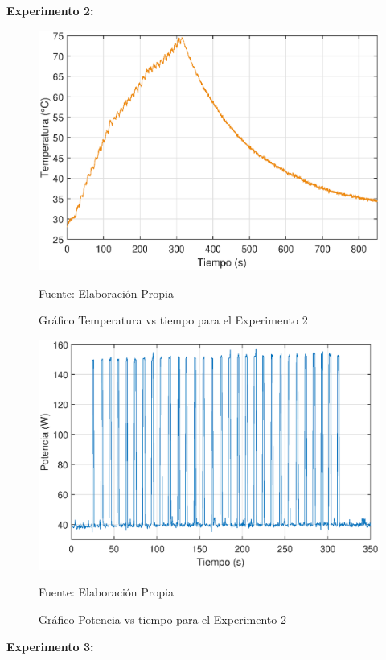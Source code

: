 \textbf{Experimento 2:}

\begin{figure}[H]
\centering
\includegraphics[scale=0.64]{Figuras/Exp1_T.eps}
\caption{Gráfico Temperatura vs tiempo para el Experimento 2}
Fuente: Elaboración Propia
\label{exp2_T}
\end{figure}

\begin{figure}[H]
\centering
\includegraphics[scale=0.66]{Figuras/Exp1_P.eps}
\caption{Gráfico Potencia vs tiempo para el Experimento 2}
Fuente: Elaboración Propia
\label{exp2_P}
\end{figure}
\textbf{Experimento 3:}

